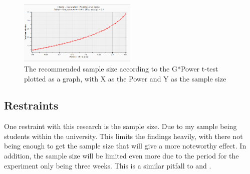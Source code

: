 \documentclass[conference]{IEEEtran}
\begin{document}
\begin{figure}[H]
\includegraphics[width = 0.5\textwidth]{fig2}
\caption{The recommended sample size according to the G*Power t-test plotted as a graph, with X as the Power and Y as the sample size}
\label{tab:figure4}
\end{figure}

\subsection {Restraints}
One restraint with this research is the sample size. Due to my sample being students within the university. This limits the findings heavily, with there not being enough to get the sample size that will give a more noteworthy effect. In addition, the sample size will be limited even more due to the period for the experiment only being three weeks. This is a similar pitfall to \cite{Naaj2021} and \cite{Ruqeyya2022}.\\
\end{document}
